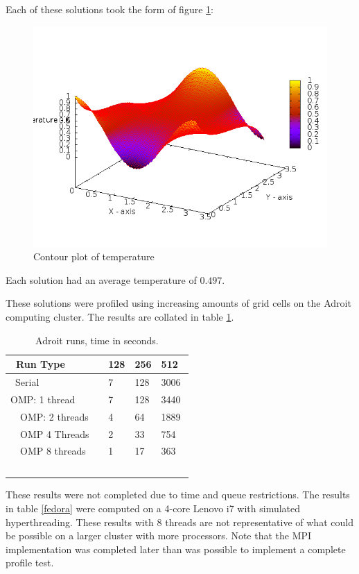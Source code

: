 \documentclass{article}
\begin{document}
  Each of these solutions took the form of figure \ref{contour}:

  \begin{figure}[ht]
    \centering
    \includegraphics[scale=0.6]{128heat.png}
    \caption{ Contour plot of temperature} \label{contour}
  \end{figure}

  Each solution had an average temperature of $0.497$.

  \clearpage

  These solutions were profiled using increasing amounts of grid cells on the Adroit computing cluster. The results are collated in table \ref{adroit}.

  \begin{table}[ht]
    \centering
    \begin{tabular}{|l|l|l|l|}
      \hline
        Run Type       & 128 & 256 & 512  \\ \hline
        Serial         & 7   & 128 & 3006 \\ 
        OMP: 1 thread  & 7   & 128 & 3440 \\ 
        OMP: 2 threads & 4   & 64  & 1889 \\ 
        OMP 4 Threads  & 2   & 33  & 754  \\ 
        OMP 8 threads  & 1   & 17  & 363  \\
        \hline
    \end{tabular}
    \caption { Adroit runs, time in seconds.}\label{adroit}
  \end{table}
    
  These results were not completed due to time and queue restrictions. 
  The results in table \ref{fedora} were computed on a 4-core Lenovo i7 with simulated hyperthreading. 
  These results with 8 threads are not representative of what could be possible on a larger cluster with more processors. 
    Note that the MPI implementation was completed later than was possible to implement a complete profile test. 
\end{document}
